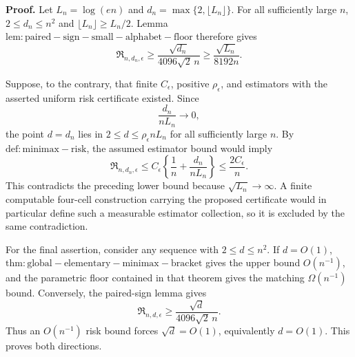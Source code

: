 \textbf{Proof.}
Let \(L_n=\log(en)\) and \(d_n=\max\{2,\lfloor L_n\rfloor\}\).  For all sufficiently large \(n\), \(2\le d_n\le n^2\) and \(\lfloor L_n\rfloor\ge L_n/2\).  Lemma \(\mathrm{lem:paired-sign-small-alphabet-floor}\) therefore gives
\[
 \mathfrak R_{n,d_n,\epsilon}
 \ge\frac{\sqrt{d_n}}{4096\sqrt2\,n}
 \ge\frac{\sqrt{L_n}}{8192n}.
\]

Suppose, to the contrary, that finite \(C_\epsilon\), positive \(\rho_\epsilon\), and estimators with the asserted uniform risk certificate existed.  Since
\[
 \frac{d_n}{nL_n}\longrightarrow0,
\]
the point \(d=d_n\) lies in \(2\le d\le\rho_\epsilon nL_n\) for all sufficiently large \(n\).  By \(\mathrm{def:minimax-risk}\), the assumed estimator bound would imply
\[
 \mathfrak R_{n,d_n,\epsilon}
 \le C_\epsilon\left\{\frac1n+\frac{d_n}{nL_n}\right\}
 \le\frac{2C_\epsilon}{n}.
\]
This contradicts the preceding lower bound because \(\sqrt{L_n}\to\infty\).  A finite computable four-cell construction carrying the proposed certificate would in particular define such a measurable estimator collection, so it is excluded by the same contradiction.

For the final assertion, consider any sequence with \(2\le d\le n^2\).  If \(d=O(1)\), \(\mathrm{thm:global-elementary-minimax-bracket}\) gives the upper bound \(O(n^{-1})\), and the parametric floor contained in that theorem gives the matching \(\Omega(n^{-1})\) bound.  Conversely, the paired-sign lemma gives
\[
 \mathfrak R_{n,d,\epsilon}
 \ge\frac{\sqrt d}{4096\sqrt2\,n}.
\]
Thus an \(O(n^{-1})\) risk bound forces \(\sqrt d=O(1)\), equivalently \(d=O(1)\).  This proves both directions.